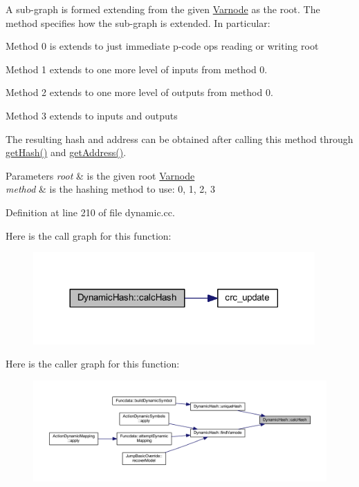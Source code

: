 A sub-\/graph is formed extending from the given \mbox{\hyperlink{class_varnode}{Varnode}} as the root. The method specifies how the sub-\/graph is extended. In particular\+:
\begin{DoxyItemize}
\item Method 0 is extends to just immediate p-\/code ops reading or writing root
\item Method 1 extends to one more level of inputs from method 0.
\item Method 2 extends to one more level of outputs from method 0.
\item Method 3 extends to inputs and outputs
\end{DoxyItemize}

The resulting hash and address can be obtained after calling this method through \mbox{\hyperlink{class_dynamic_hash_ae25a2b1eca6a505bcb4e97b67eb1b2e7}{get\+Hash()}} and \mbox{\hyperlink{class_dynamic_hash_a304ee882e7ad7f4edd33bda810622cb2}{get\+Address()}}. 
\begin{DoxyParams}{Parameters}
{\em root} & is the given root \mbox{\hyperlink{class_varnode}{Varnode}} \\
\hline
{\em method} & is the hashing method to use\+: 0, 1, 2, 3 \\
\hline
\end{DoxyParams}


Definition at line 210 of file dynamic.\+cc.

Here is the call graph for this function\+:
\nopagebreak
\begin{figure}[H]
\begin{center}
\leavevmode
\includegraphics[width=305pt]{class_dynamic_hash_ae48f268d1cc95b75aeda1b6d563df0a9_cgraph}
\end{center}
\end{figure}
Here is the caller graph for this function\+:
\nopagebreak
\begin{figure}[H]
\begin{center}
\leavevmode
\includegraphics[width=350pt]{class_dynamic_hash_ae48f268d1cc95b75aeda1b6d563df0a9_icgraph}
\end{center}
\end{figure}
\mbox{\label{class_dynamic_hash_aa260964020db06dfcee8565544aa3b96}} 
